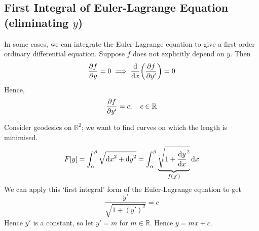 \subsection{First Integral of Euler-Lagrange Equation (eliminating \(y\))}
In some cases, we can integrate the Euler-Lagrange equation to give a first-order ordinary differential equation.
Suppose \(f\) does not explicitly depend on \(y\).
Then
\[
	\pdv{f}{y} = 0 \implies \dv{x}\qty(\pdv{f}{y'}) = 0
\]
Hence,
\[
	\pdv{f}{y'} = c;\quad c \in \mathbb R
\]
\begin{example}
	Consider geodesics on \(\mathbb R^2\); we want to find curves on which the length is minimised.
	\[
		F[y] = \int_\alpha^\beta \sqrt{\dd{x}^2 + \dd{y}^2} = \int_\alpha^\beta \underbrace{\sqrt{1 + \dv{y}{x}^2}}_{f(y')}\dd{x}
	\]
	We can apply this `first integral' form of the Euler-Lagrange equation to get
	\[
		\frac{y'}{\sqrt{1 + (y')^2}} = c
	\]
	Hence \(y'\) is a constant, so let \(y' = m\) for \(m \in \mathbb R\).
	Hence \(y = mx + c\).
\end{example}
